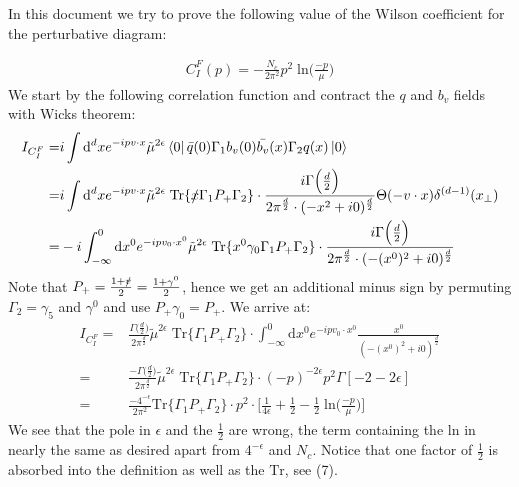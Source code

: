 \documentclass[openright,twoside,12pt,a4paper,final]{article}
\begin{document}
	\noindent
	In this document we try to prove the following value of the Wilson coefficient for the perturbative diagram:
	
	\begin{align}
		C_I^F (p) = -\frac{N_c}{2\pi^2} p^2 \;  \mathrm{ln}\big(\frac{-p}{\mu}\big)
	\end{align}
	\noindent	
	We start by the following correlation function and contract the $q$ and $b_v$ fields with Wicks theorem:
	\begin{align}
		I_{C^F_I} =& i \int \mathrm{d}^d x e^{-ipv \cdot x} \tilde{\mu}^{2\epsilon} \bra{0} \bar{q}(0) \Gamma_1 b_v(0) \bar{b_v}(x) \Gamma_2 q(x) \ket{0} \nonumber \\ =& i \int \mathrm{d}^d x e^{-ipv \cdot x} \tilde{\mu}^{2\epsilon} \;  \mathrm{Tr} \{\slashed{x} \Gamma_1 P_+ \Gamma_2\} \cdot \frac{i \Gamma\Big(\frac{d}{2}\Big)}{2 \pi^{\frac{d}{2}} \cdot (-x^2 + i0)^{\frac{d}{2}}} \Theta(-v \cdot x) \delta^{(d - 1)}(x_{\perp}) \nonumber \\ =& -i \int_{-\infty}^{0} \mathrm{d} x^0 e^{-ipv_0 \cdot x^0} \tilde{\mu}^{2\epsilon} \;  \mathrm{Tr} \{x^0 \gamma_0 \Gamma_1 P_+ \Gamma_2\} \cdot \frac{i \Gamma\Big(\frac{d}{2}\Big)}{2 \pi^{\frac{d}{2}} \cdot (-(x^0)^2 + i0)^{\frac{d}{2}}} \nonumber
	\end{align}
	Note that $P_+ = \frac{1 + \slashed{v}}{2} = \frac{1 + \gamma^0}{2}$, hence we get an additional minus sign by permuting $\Gamma_2 = \gamma_5$ and $\gamma^0$ and use $P_+ \gamma_0 = P_+$. We arrive at:
	\begin{align}
		I_{C^F_I} =& \frac{\Gamma\Big(\frac{d}{2}\Big)}{2 \pi^{\frac{d}{2}} }\tilde{\mu}^{2\epsilon} \; \mathrm{Tr} \{\Gamma_1 P_+ \Gamma_2\} \cdot \int_{-\infty}^{0} \mathrm{d} x^0 e^{-ipv_0 \cdot x^0}  \frac{x^0}{(-(x^0)^2 + i0)^{\frac{d}{2}}} \nonumber \\ =& \frac{-\Gamma\Big(\frac{d}{2}\Big)}{2 \pi^{\frac{d}{2}} }\tilde{\mu}^{2\epsilon} \; \mathrm{Tr} \{\Gamma_1 P_+ \Gamma_2\} \cdot (-p)^{-2 \epsilon} p^2 \Gamma[-2 - 2\epsilon] \nonumber \\ =& \frac{-4^{-\epsilon}}{2 \pi^2} \mathrm{Tr} \{\Gamma_1 P_+ \Gamma_2\} \cdot  p^2 \cdot  \Big[\frac{1}{4 \epsilon} + \frac{1}{2} - \frac{1}{2} \; \mathrm{ln} \big(\frac{-p}{\mu}\big)\Big]
	\end{align}
	We see that the pole in $\epsilon$ and the $\frac{1}{2}$ are wrong, the term containing the $\mathrm{ln}$ in nearly the same as desired apart from $4^{-\epsilon}$ and $N_c$. Notice that one factor of $\frac{1}{2}$ is absorbed into the definition as well as the $\mathrm{Tr}$, see (7).
\end{document}
